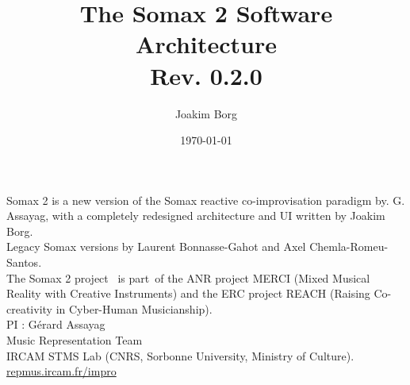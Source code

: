 \documentclass[10pt]{report}
\title{The Somax 2 Software Architecture\\[0.24cm]
	\large{Rev. 0.2.0}}
\author{Joakim Borg }
\date{\today}
\begin{document}
\maketitle
\chapter*{}
\small{
Somax 2 is a new version of the Somax reactive co-improvisation paradigm by. G. Assayag, with a completely redesigned architecture and UI written by Joakim Borg.
\\

\noindent Legacy Somax versions by Laurent Bonnasse-Gahot and Axel Chemla-Romeu-Santos.
\\

\noindent The Somax 2 project  is part of the ANR project MERCI (Mixed Musical Reality with Creative Instruments) and the ERC project REACH (Raising Co-creativity in Cyber-Human Musicianship).
\\

\noindent PI : Gérard Assayag\\
Music Representation Team\\
IRCAM STMS Lab (CNRS, Sorbonne University, Ministry of Culture).
\\

\noindent\url{repmus.ircam.fr/impro}
}

\tableofcontents







{}

\end{document}
